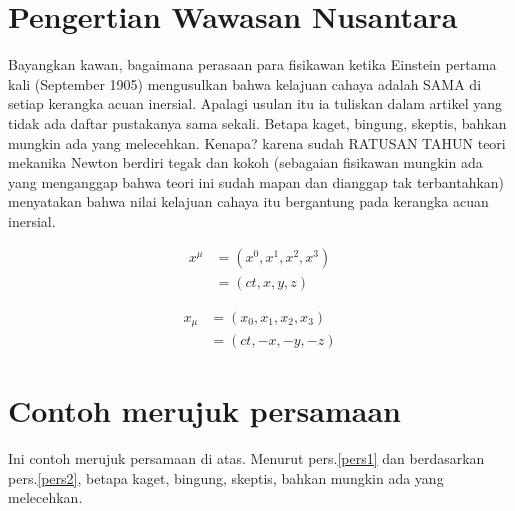 \section{Pengertian Wawasan Nusantara}
Bayangkan kawan, bagaimana perasaan para fisikawan ketika Einstein pertama kali (September 1905) mengusulkan bahwa kelajuan  cahaya adalah SAMA di setiap kerangka acuan inersial. Apalagi usulan itu ia tuliskan dalam artikel yang tidak ada daftar pustakanya sama sekali. Betapa kaget, bingung, skeptis, bahkan mungkin ada yang melecehkan. Kenapa? karena sudah RATUSAN TAHUN teori mekanika Newton berdiri tegak dan kokoh (sebagaian fisikawan mungkin ada yang menganggap bahwa teori ini sudah mapan dan dianggap tak terbantahkan) menyatakan bahwa nilai kelajuan cahaya itu bergantung pada kerangka acuan inersial\cite{arikunto2002}. 

\begin{equation}
\label{pers1}
\begin{split}
x^\mu & = (x^0,x^1,x^2,x^3 )\\ 
& = ( ct,x,y,z )
\end{split}
\end{equation}

\begin{equation}
\label{pers2}
\begin{split}
x_\mu & = (x_0,x_1,x_2,x_3 )\\
& = ( ct,-x,-y,-z )
\end{split}
\end{equation}

\section{Contoh merujuk persamaan}

Ini contoh merujuk persamaan di atas. Menurut pers.\eqref{pers1} dan berdasarkan pers.\eqref{pers2}, betapa kaget, bingung, skeptis, bahkan mungkin ada yang melecehkan.
